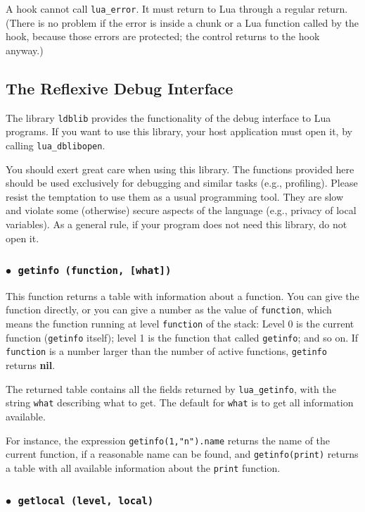 \documentclass[11pt]{article}
\newcommand{\T}[1]{{\tt #1}}
\newcommand{\nil}{{\bf nil}}
\newcommand{\Deffunc}[1]{\index{#1}}
\newcommand{\ff}{$\bullet$\ }
\begin{document}
A hook cannot call \T{lua_error}.
It must return to Lua through a regular return.
(There is no problem if the error is inside a chunk or a Lua function
called by the hook, because those errors are protected;
the control returns to the hook anyway.)


\subsection{The Reflexive Debug Interface}

The library \verb|ldblib| provides
the functionality of the debug interface to Lua programs.
If you want to use this library,
your host application must open it,
by calling \verb|lua_dblibopen|.

You should exert great care when using this library.
The functions provided here should be used exclusively for debugging
and similar tasks (e.g., profiling).
Please resist the temptation to use them as a
usual programming tool.
They are slow and violate some (otherwise) secure aspects of the
language (e.g., privacy of local variables).
As a general rule, if your program does not need this library,
do not open it.


\subsubsection*{\ff \T{getinfo (function, [what])}}\Deffunc{getinfo}

This function returns a table with information about a function.
You can give the function directly,
or you can give a number as the value of \verb|function|,
which means the function running at level \verb|function| of the stack:
Level 0 is the current function (\verb|getinfo| itself);
level 1 is the function that called \verb|getinfo|;
and so on.
If \verb|function| is a number larger than the number of active functions,
\verb|getinfo| returns \nil.

The returned table contains all the fields returned by \verb|lua_getinfo|,
with the string \verb|what| describing what to get.
The default for \verb|what| is to get all information available.

For instance, the expression \verb|getinfo(1,"n").name| returns
the name of the current function, if a reasonable name can be found,
and \verb|getinfo(print)| returns a table with all available information
about the \verb|print| function.


\subsubsection*{\ff \T{getlocal (level, local)}}\Deffunc{getlocal}
\end{document}
